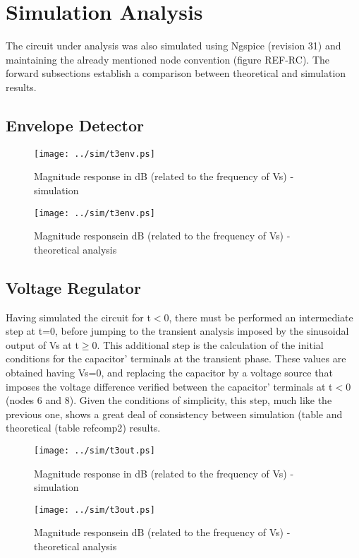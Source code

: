 \section{Simulation Analysis}
\label{sec:simulation}

The circuit under analysis was also simulated using Ngspice (revision 31) and maintaining the already mentioned node convention (figure REF-RC). The forward subsections establish a comparison between theoretical and simulation results.

\subsection{Envelope Detector}




\begin{figure}[h] \centering
  \begin{minipage}{.5\textwidth}
    \texttt{[image: ../sim/t3env.ps]}
    \caption{Magnitude response in dB (related to the frequency of Vs) - simulation}
    \label{fig:simenv}
    \end{minipage}%
  \begin{minipage}{.5\textwidth}
  \centering
    \texttt{[image: ../sim/t3env.ps]}
    \caption{Magnitude responsein dB (related to the frequency of Vs) - theoretical analysis }
    \label{fig:compenv}
      \end{minipage}%
\end{figure}

\subsection{Voltage Regulator}

Having simulated the circuit for t$<$0, there must be performed an intermediate step at t=0, before jumping to the transient analysis imposed by the sinusoidal output of Vs at t$\geq$0. This additional step is the calculation of the initial conditions for the capacitor' terminals at the transient phase. These values are obtained having Vs=0, and replacing the capacitor by a voltage source that imposes the voltage difference verified between the capacitor' terminals at t$<$0 (nodes 6 and 8). Given the conditions of simplicity, this step, much like the previous one, shows a great deal of consistency between simulation (table  and theoretical (table ref{comp2}) results. 




\begin{figure}[h] \centering
  \begin{minipage}{.5\textwidth}
    \texttt{[image: ../sim/t3out.ps]}
    \caption{Magnitude response in dB (related to the frequency of Vs) - simulation}
    \label{fig:simout}
    \end{minipage}%
  \begin{minipage}{.5\textwidth}
  \centering
    \texttt{[image: ../sim/t3out.ps]}
    \caption{Magnitude responsein dB (related to the frequency of Vs) - theoretical analysis }
    \label{fig:compout}
      \end{minipage}%
\end{figure}

